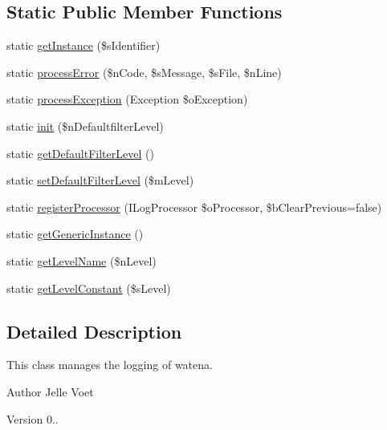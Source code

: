 \subsection*{Static Public Member Functions}
\begin{DoxyCompactItemize}
\item 
static \hyperlink{class_logger_aed3978ed47955016b1f2e36fa9242495}{get\-Instance} (\$s\-Identifier)
\item 
static \hyperlink{class_logger_ab19e37ceb28c720c85dbd1190247f094}{process\-Error} (\$n\-Code, \$s\-Message, \$s\-File, \$n\-Line)
\item 
static \hyperlink{class_logger_ab6ff3cbd5cae35325708da45422f9ddb}{process\-Exception} (Exception \$o\-Exception)
\item 
static \hyperlink{class_logger_adabe3643869b619254f23b0ff7a8d9d0}{init} (\$n\-Defaultfilter\-Level)
\item 
static \hyperlink{class_logger_a3af4a199ee9ff77080b287d445fd7258}{get\-Default\-Filter\-Level} ()
\item 
static \hyperlink{class_logger_a7af0235d7605c027e8fc05014c5e8a02}{set\-Default\-Filter\-Level} (\$m\-Level)
\item 
static \hyperlink{class_logger_a745cf7ce062b1a552914d835be207fd6}{register\-Processor} (I\-Log\-Processor \$o\-Processor, \$b\-Clear\-Previous=false)
\item 
static \hyperlink{class_logger_a7cd51ad43efe88cfde3c1ebdc988940b}{get\-Generic\-Instance} ()
\item 
static \hyperlink{class_logger_a01709c6e4bc16337f430ab0d657f187f}{get\-Level\-Name} (\$n\-Level)
\item 
static \hyperlink{class_logger_aba0511b6a8e0338bfe1edf5fb6eb4b59}{get\-Level\-Constant} (\$s\-Level)
\end{DoxyCompactItemize}


\subsection{Detailed Description}
This class manages the logging of watena.

\begin{DoxyAuthor}{Author}
Jelle Voet 
\end{DoxyAuthor}
\begin{DoxyVersion}{Version}
0.. 
\end{DoxyVersion}


